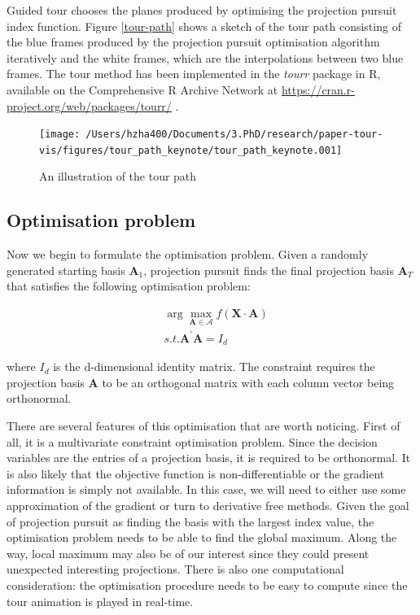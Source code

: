\documentclass[12pt]{article}
\begin{document}
Guided tour chooses the planes produced by optimising the projection
pursuit index function. Figure \ref{tour-path} shows a sketch of the
tour path consisting of the blue frames produced by the projection
pursuit optimisation algorithm iteratively and the white frames, which
are the interpolations between two blue frames. The tour method has been
implemented in the \emph{tourr} package in R, available on the
Comprehensive R Archive Network at
\url{https://cran.r-project.org/web/packages/tourr/}
\citep{wickham2011tourrpackage}.

\begin{figure}
\texttt{[image: /Users/hzha400/Documents/3.PhD/research/paper-tour-vis/figures/tour\_path\_keynote/tour\_path\_keynote.001]} \caption{\label{tour-path}An illustration of the tour path}\label{fig:tour-path}
\end{figure}

\newpage

\hypertarget{tour-optim}{%
\subsection{Optimisation problem}\label{tour-optim}}

Now we begin to formulate the optimisation problem. Given a randomly
generated starting basis \(\mathbf{A}_1\), projection pursuit finds the
final projection basis \(\mathbf{A}_T\) that satisfies the following
optimisation problem:

\begin{align}
&\arg \max_{\mathbf{A} \in \mathcal{A}} f(\mathbf{X} \cdot \mathbf{A}) \\
&s.t.  \mathbf{A}^{\prime} \mathbf{A} = I_d
\end{align}

where \(I_d\) is the d-dimensional identity matrix. The constraint
requires the projection basis \(\mathbf{A}\) to be an orthogonal matrix
with each column vector being orthonormal.

There are several features of this optimisation that are worth noticing.
First of all, it is a multivariate constraint optimisation problem.
Since the decision variables are the entries of a projection basis, it
is required to be orthonormal. It is also likely that the objective
function is non-differentiable or the gradient information is simply not
available. In this case, we will need to either use some approximation
of the gradient or turn to derivative free methods. Given the goal of
projection pursuit as finding the basis with the largest index value,
the optimisation problem needs to be able to find the global maximum.
Along the way, local maximum may also be of our interest since they
could present unexpected interesting projections. There is also one
computational consideration: the optimisation procedure needs to be easy
to compute since the tour animation is played in real-time.
\end{document}
